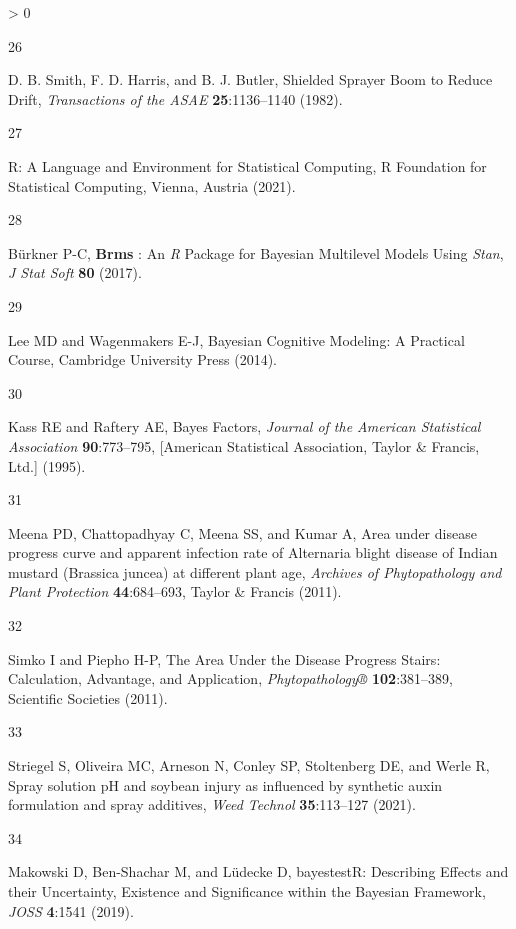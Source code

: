 \documentclass[
  12pt,
  a4paper,
]{article}
\newlength{\cslhangindent}
\newlength{\csllabelwidth}
\newenvironment{CSLReferences}[2] %
 {%
  \setlength{\parindent}{0pt}
  \ifodd #1 \everypar{\setlength{\hangindent}{\cslhangindent}}\ignorespaces\fi
  \ifnum #2 > 0
  \setlength{\parskip}{#2\baselineskip}
  \fi
 }%
 {}
\newcommand{\CSLLeftMargin}[1]{\parbox[t]{\csllabelwidth}{#1}}
\newcommand{\CSLRightInline}[1]{\parbox[t]{\linewidth - \csllabelwidth}{#1}\break}
\begin{document}
\begin{CSLReferences}{1}{0}
\leavevmode\hypertarget{ref-d.b.smith1982}{}%
\CSLLeftMargin{26 }
\CSLRightInline{D. B. Smith, F. D. Harris, and B. J. Butler, Shielded
{Sprayer Boom} to {Reduce Drift}, \emph{Transactions of the ASAE}
\textbf{25}:1136--1140 (1982).}

\leavevmode\hypertarget{ref-LanguageEnvironmentStatistical2021}{}%
\CSLLeftMargin{27 }
\CSLRightInline{R: {A Language} and {Environment} for {Statistical
Computing}, {R Foundation for Statistical Computing}, {Vienna, Austria}
(2021).}

\leavevmode\hypertarget{ref-burknerBrmsPackageBayesian2017}{}%
\CSLLeftMargin{28 }
\CSLRightInline{Bürkner P-C, \textbf{Brms} : {An} {\emph{R}} {Package}
for {Bayesian Multilevel Models Using} {\emph{Stan}}, \emph{J Stat Soft}
\textbf{80} (2017).}

\leavevmode\hypertarget{ref-leeBayesianCognitiveModeling2014}{}%
\CSLLeftMargin{29 }
\CSLRightInline{Lee MD and Wagenmakers E-J, Bayesian {Cognitive
Modeling}: {A Practical Course}, {Cambridge University Press} (2014).}

\leavevmode\hypertarget{ref-kassBayesFactors1995}{}%
\CSLLeftMargin{30 }
\CSLRightInline{Kass RE and Raftery AE, Bayes {Factors}, \emph{Journal
of the American Statistical Association} \textbf{90}:773--795,
{{[}American Statistical Association, Taylor \& Francis, Ltd.{]}}
(1995).}

\leavevmode\hypertarget{ref-meenaAreaDiseaseProgress2011}{}%
\CSLLeftMargin{31 }
\CSLRightInline{Meena PD, Chattopadhyay C, Meena SS, and Kumar A, Area
under disease progress curve and apparent infection rate of {Alternaria}
blight disease of {Indian} mustard ({Brassica} juncea) at different
plant age, \emph{Archives of Phytopathology and Plant Protection}
\textbf{44}:684--693, {Taylor \& Francis} (2011).}

\leavevmode\hypertarget{ref-simkoAreaDiseaseProgress2011}{}%
\CSLLeftMargin{32 }
\CSLRightInline{Simko I and Piepho H-P, The {Area Under} the {Disease
Progress Stairs}: {Calculation}, {Advantage}, and {Application},
\emph{Phytopathology®} \textbf{102}:381--389, {Scientific Societies}
(2011).}

\leavevmode\hypertarget{ref-striegelSpraySolutionPH2021}{}%
\CSLLeftMargin{33 }
\CSLRightInline{Striegel S, Oliveira MC, Arneson N, Conley SP,
Stoltenberg DE, and Werle R, Spray solution {pH} and soybean injury as
influenced by synthetic auxin formulation and spray additives,
\emph{Weed Technol} \textbf{35}:113--127 (2021).}

\leavevmode\hypertarget{ref-makowski2019}{}%
\CSLLeftMargin{34 }
\CSLRightInline{Makowski D, Ben-Shachar M, and Lüdecke D, {bayestestR}:
{Describing Effects} and their {Uncertainty}, {Existence} and
{Significance} within the {Bayesian Framework}, \emph{JOSS}
\textbf{4}:1541 (2019).}


\end{CSLReferences}
\end{document}
